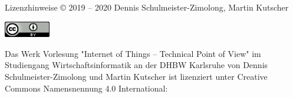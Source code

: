 {
    \tiny
    \begin{frame}{Lizenzhinweise}
            © 2019 -- 2020 Dennis Schulmeister-Zimolong, Martin Kutscher
            \medskip

            \medskip

            \includegraphics[width=2cm]{include/cc-by.png}
            \medskip

            Das Werk Vorlesung "Internet of Things – Technical Point of View" im Studiengang
            Wirtschaftsinformatik an der DHBW Karlsruhe von Dennis Schulmeister-Zimolong
            und Martin Kutscher ist lizenziert unter Creative Commons Namensnennung 4.0 International:
            \medskip

    \end{frame}
}
